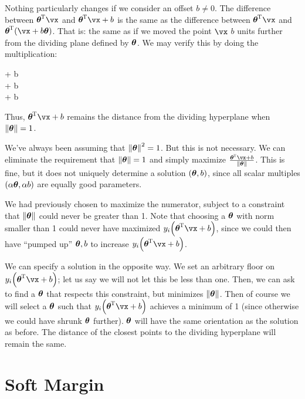 \documentclass[11pt, oneside]{amsart}
\begin{document}
Nothing particularly changes if we consider an offset $b \ne 0$. The
difference between $\vtheta\tran \vx$ and $\vtheta\tran \vx + b$ is the
same as the difference between $\vtheta\tran \vx$ and $\vtheta\tran
\parens{\vx + b\vtheta}$. That is: the same as if we moved the point
$\vx$ $b$ units further from the dividing plane defined by $\bm{\mathrm{\theta}}$. We
may verify this by doing the multiplication:

\begin{nedqn}
    \vtheta\tran {}
  \eqcol
    \vtheta\tran \vx + b \vtheta\tran \vtheta
  \\
  \eqcol
    \vtheta\tran \vx + b \normsq{\vtheta}
  \\
  \eqcol
    \vtheta\tran \vx + b
\end{nedqn}

\noindent
Thus, $\vtheta\tran \vx + b$ remains the distance from the dividing
hyperplane when $\left\Vert \bm{\mathrm{\theta}} \right\Vert = 1$.

We've always been assuming that $\left\Vert \bm{\mathrm{\theta}} \right\Vert^2 = 1$. But this is not
necessary. We can eliminate the requirement that $\left\Vert \bm{\mathrm{\theta}} \right\Vert = 1$
and simply maximize $\frac{\vtheta\tran \vx + b}{\norm{\vtheta}}$. This
is fine, but it does not uniquely determine a solution $\mathopen{}\left( {\bm{\mathrm{\theta}},
b} \right)\mathclose{}$, since all scalar multiples $\mathopen{}\left( {\alpha \bm{\mathrm{\theta}}, \alpha b} \right)\mathclose{}$ are
equally good parameters.

We had previously chosen to maximize the numerator, subject to a
constraint that $\left\Vert \bm{\mathrm{\theta}} \right\Vert$ could never be greater than 1. Note
that choosing a $\bm{\mathrm{\theta}}$ with norm smaller than 1 could never have
maximized $y_i \parens{\vtheta\tran \vx + b}$, since we could then have
``pumped up'' $\bm{\mathrm{\theta}}, b$ to increase $y_i \parens{\vtheta\tran \vx +
b}$.

We can specify a solution in the opposite way. We set an arbitrary floor
on $y_i \parens{\vtheta\tran \vx + b}$; let us say we will not let this
be less than one. Then, we can ask to find a $\bm{\mathrm{\theta}}$ that respects
this constraint, but minimizes $\left\Vert \bm{\mathrm{\theta}} \right\Vert$. Then of course we will
select a $\bm{\mathrm{\theta}}$ such that $y_i \parens{\vtheta\tran \vx + b}$
achieves a minimum of 1 (since otherwise we could have shrunk $\bm{\mathrm{\theta}}$
further). $\bm{\mathrm{\theta}}$ will have the same orientation as the solution as
before. The distance of the closest points to the dividing hyperplane
will remain the same.

\section{Soft Margin}
\end{document}

